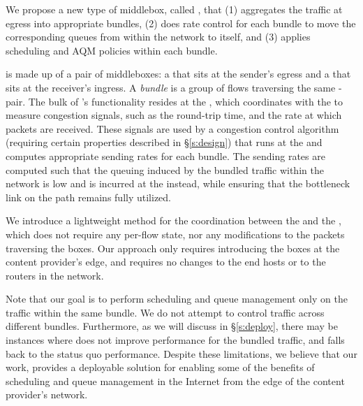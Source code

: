 We propose a new type of middlebox, called \name, that (1) aggregates the traffic at  egress into appropriate bundles, (2) does rate control for each bundle to move the corresponding queues from within the network to itself, and (3) applies scheduling and AQM policies within each bundle. 

\name is made up of a pair of middleboxes: a \emph{\inbox} that sits at the sender's egress and a \emph{\outbox} that sits at the receiver's ingress. A \emph{bundle} is a group of flows traversing the same \inbox{}-\outbox{} pair. The bulk of \name's functionality resides at the \inbox, which coordinates with the \outbox to measure congestion signals, such as the round-trip time, and the rate at which packets are received. These signals are used by a congestion control algorithm (requiring certain properties described in \S\ref{s:design}) that runs at the \inbox and computes appropriate sending rates for each bundle. The sending rates are computed such that the queuing induced by the bundled traffic within the network is low and is incurred at the \inbox instead, while ensuring that the bottleneck link on the path remains fully utilized. 
 
We introduce a lightweight method for the coordination between the \inbox and the \outbox, which does not require any per-flow state, nor any modifications to the packets traversing the \name boxes. Our approach only requires introducing the \name boxes at the content provider's edge, and requires no changes to the end hosts or to the routers in the network. 
 
Note that our goal is to perform scheduling and queue management only on the traffic within the same bundle. We do not attempt to control traffic across different bundles. Furthermore, as we will discuss in \S\ref{s:deploy}, there may be instances where \name does not improve performance for the bundled traffic, and falls back to the status quo performance. Despite these limitations, we believe that our work, provides a deployable solution for enabling some of the benefits of scheduling and queue management in the Internet from the edge of the content provider's network.
 
